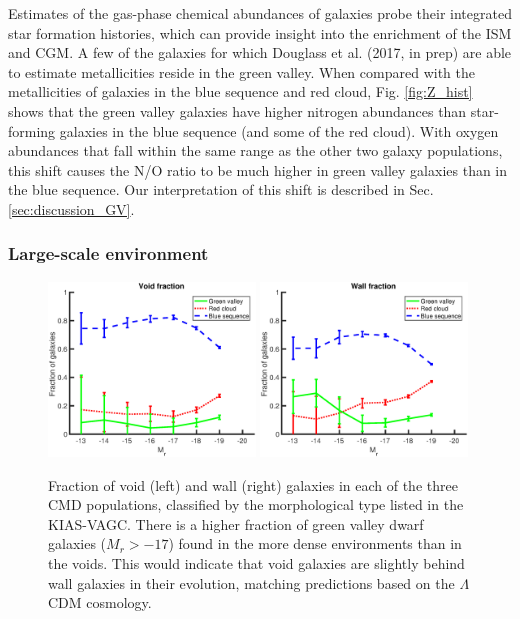 Estimates of the gas-phase chemical abundances of galaxies probe their 
integrated star formation histories, which can provide insight into the 
enrichment of the ISM and CGM.  A few of the galaxies for which Douglass et al. 
(2017, in prep) are able to estimate metallicities reside in the green valley.  
When compared with the metallicities of galaxies in the blue sequence and red 
cloud, Fig. \ref{fig:Z_hist} shows that the green valley galaxies have higher 
nitrogen abundances than star-forming galaxies in the blue sequence (and some of 
the red cloud).  With oxygen abundances that fall within the same range as the 
other two galaxy populations, this shift causes the N/O ratio to be much higher 
in green valley galaxies than in the blue sequence.  Our interpretation of this 
shift is described in Sec. \ref{sec:discussion_GV}.


\subsubsection{Large-scale environment}

\begin{figure}
    \includegraphics[width=0.49\textwidth]{Images/GV/voidFrac_CMD}
    \includegraphics[width=0.49\textwidth]{Images/GV/wallFrac_CMD}
    \caption[Fraction of galaxies in CMD populations by morphological type]
    {Fraction of void (left) and wall (right) galaxies in each of the three CMD 
    populations, classified by the morphological type listed in the KIAS-VAGC.  
    There is a higher fraction of green valley dwarf galaxies ($M_r > -17$) 
    found in the more dense environments than in the voids.  This would indicate 
    that void galaxies are slightly behind wall galaxies in their evolution, 
    matching predictions based on the $\Lambda$CDM cosmology.}
    \label{fig:Mr_bin}
\end{figure}

